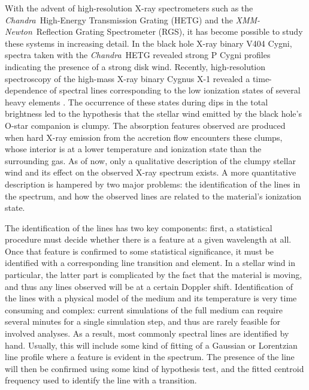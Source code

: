 \documentclass[12pt]{emulateapj}
\newcommand{\project}[1]{\textsl{#1}}
\newcommand{\chandra}{\project{Chandra}}
\newcommand{\xmm}{\project{XMM-Newton}}
\begin{document}
With the advent of high-resolution X-ray spectrometers such as the \chandra\ High-Energy Transmission Grating (HETG) and the \xmm\ Reflection Grating Spectrometer (RGS), it has become possible to study these systems in increasing detail. In the black hole X-ray binary V404 Cygni, spectra taken with the \chandra\ HETG revealed strong P Cygni profiles indicating the presence of a strong disk wind. Recently, high-resolution spectroscopy of the high-mass X-ray binary Cygnus X-1 revealed a time-dependence of spectral lines corresponding to the low ionization states of several heavy elements \citep{hirsch_inprep}. The occurrence of these states during dips in the total brightness led to the hypothesis that the stellar wind emitted by the black hole's O-star companion is clumpy. The absorption features observed are produced when hard X-ray emission from the accretion flow encounters these clumps, whose interior is at a lower temperature and ionization state than the surrounding gas. As of now, only a qualitative description of the clumpy stellar wind and its effect on the observed X-ray spectrum exists. A more quantitative description is hampered by two major problems: the identification of the lines in the spectrum, and how the observed lines are related to the material's ionization state. 

The identification of the lines has two key components: first, a statistical procedure must decide whether there is a feature at a given wavelength at all. Once that feature is confirmed to some statistical significance, it must be identified with a corresponding line transition and element. In a stellar wind in particular, the latter part is complicated by the fact that the material is moving, and thus any lines observed will be at a certain Doppler shift. Identification of the lines with a physical model of the medium and its temperature is very time consuming and complex: current simulations of the full medium can require several minutes for a single simulation step, and thus are rarely feasible for involved analyses. As a result, most commonly spectral lines are identified by hand. Usually, this will include some kind of fitting of a Gaussian or Lorentzian line profile where a feature is evident in the spectrum. The presence of the line will then be confirmed using some kind of hypothesis test, and the fitted centroid frequency used to identify the line with a transition. 
\end{document}
